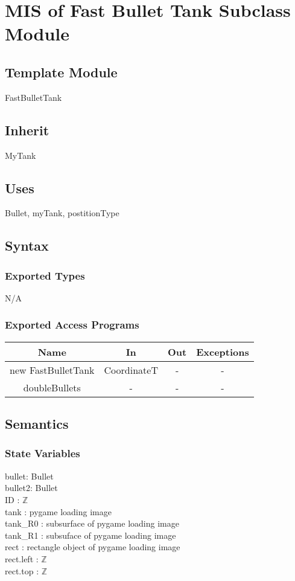 \documentclass[12pt, titlepage]{article}
\begin{document}
\section{MIS of Fast Bullet Tank Subclass Module}
        \subsection{Template Module}
        FastBulletTank
        
        \subsection{Inherit}
        MyTank
        
        \subsection{Uses}
        Bullet, myTank, postitionType
		\subsection{Syntax}
		\subsubsection{Exported Types}
		N/A
		\subsubsection{Exported Access Programs}
		
	\begin{tabular}[pos]{|c|c|c|c|}
	\hline
	\textbf{Name}& \textbf{In} & \textbf{Out} & \textbf{Exceptions} \\ 
	\hline
	new FastBulletTank & CoordinateT & - & -\\ 
	\hline
	doubleBullets & - & - & -\\ 
	\hline
					
	\end{tabular}		
		
		
		\subsection{Semantics}
		\subsubsection{State Variables}
		bullet: Bullet\\
		bullet2: Bullet\\
		ID : $\mathbb{Z}$\\
		tank : pygame loading image\\
		tank\_R0 : subsurface of pygame loading image\\
		tank\_R1 : subsuface of pygame loading image\\
		rect : rectangle object of pygame loading image\\
		rect.left : $\mathbb{Z}$\\
		rect.top : $\mathbb{Z}$
		
\end{document}

